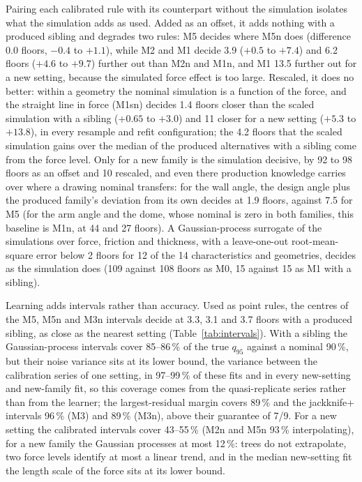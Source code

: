 \documentclass[pdflatex,sn-basic,lineno]{sn-jnl}
\begin{document}
Pairing each calibrated rule with its counterpart without the simulation isolates what the simulation adds as used. Added as an offset, it adds nothing with a produced sibling and degrades two rules: M5 decides where M5n does (difference 0.0 floors, $-0.4$ to $+1.1$), while M2 and M1 decide 3.9 ($+0.5$ to $+7.4$) and 6.2 floors ($+4.6$ to $+9.7$) further out than M2n and M1n, and M1 13.5 further out for a new setting, because the simulated force effect is too large. Rescaled, it does no better: within a geometry the nominal simulation is a function of the force, and the straight line in force (M1sn) decides 1.4 floors closer than the scaled simulation with a sibling ($+0.65$ to $+3.0$) and 11 closer for a new setting ($+5.3$ to $+13.8$), in every resample and refit configuration; the 4.2 floors that the scaled simulation gains over the median of the produced alternatives with a sibling come from the force level. Only for a new family is the simulation decisive, by 92 to 98 floors as an offset and 10 rescaled, and even there production knowledge carries over where a drawing nominal transfers: for the wall angle, the design angle plus the produced family's deviation from its own decides at 1.9 floors, against 7.5 for M5 (for the arm angle and the dome, whose nominal is zero in both families, this baseline is M1n, at 44 and 27 floors). A Gaussian-process surrogate of the simulations over force, friction and thickness, with a leave-one-out root-mean-square error below 2 floors for 12 of the 14 characteristics and geometries, decides as the simulation does (109 against 108 floors as M0, 15 against 15 as M1 with a sibling).

Learning adds intervals rather than accuracy. Used as point rules, the centres of the M5, M5n and M3n intervals decide at 3.3, 3.1 and 3.7 floors with a produced sibling, as close as the nearest setting (Table~\ref{tab:intervals}). With a sibling the Gaussian-process intervals cover 85--86\,\% of the true $q_{95}$ against a nominal 90\,\%, but their noise variance sits at its lower bound, the variance between the calibration series of one setting, in 97--99\,\% of these fits and in every new-setting and new-family fit, so this coverage comes from the quasi-replicate series rather than from the learner; the largest-residual margin covers 89\,\% and the jackknife+ intervals 96\,\% (M3) and 89\,\% (M3n), above their guarantee of 7/9. For a new setting the calibrated intervals cover 43--55\,\% (M2n and M5n 93\,\% interpolating), for a new family the Gaussian processes at most 12\,\%: trees do not extrapolate, two force levels identify at most a linear trend, and in the median new-setting fit the length scale of the force sits at its lower bound.
\end{document}
